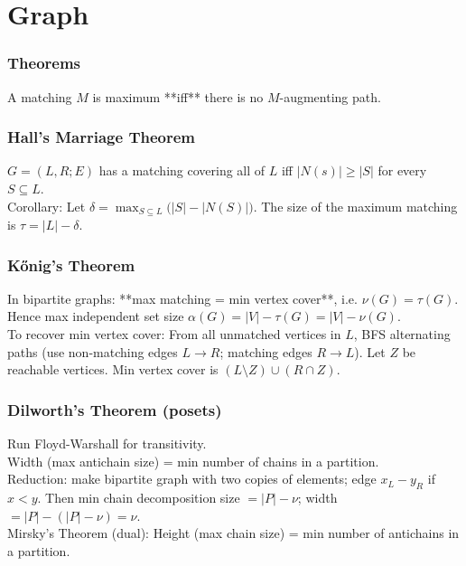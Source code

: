 \chapter{Graph}

\subsection{Theorems}

  	A matching $M$ is maximum **iff** there is no $M$-augmenting path. \\

	\subsection{Hall's Marriage Theorem}
		$G = (L, R; E)$ has a matching covering all of $L$ iff $|N(s)| \ge |S|$ for every $S \subseteq L$. \\
		Corollary: Let $\delta=\max_{S\subseteq L}\big(|S|-|N(S)|\big)$. The size of the maximum matching is $\tau = |L|-\delta$. \\

	\subsection{Kőnig's Theorem}
 		In bipartite graphs: **max matching = min vertex cover**, i.e. $\nu(G)=\tau(G)$.
		Hence max independent set size $\alpha(G)=|V|-\tau(G)=|V|-\nu(G)$. \\

		To recover min vertex cover: 
		From all unmatched vertices in $L$, BFS alternating paths (use non-matching edges $L\!\to\!R$; matching edges $R\!\to\!L$).
		Let $Z$ be reachable vertices. Min vertex cover is $(L\setminus Z)\cup(R\cap Z)$. \\

	\subsection{Dilworth's Theorem (posets)}
		Run Floyd-Warshall for transitivity. \\
		Width (max antichain size) = min number of chains in a partition. \\
		Reduction: make bipartite graph with two copies of elements; edge $x_L\!-\!y_R$ if $x<y$. Then
		min chain decomposition size $= |P|-\nu$; width $= |P|-(|P|-\nu)=\nu$. \\
		Mirsky’s Theorem (dual): Height (max chain size) = min number of antichains in a partition. \\

